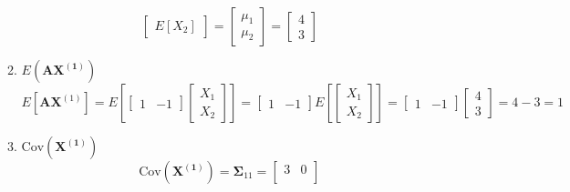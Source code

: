 \begin{enumerate}[font=\bfseries]
\begin{enumerate}
\[\begin{bmatrix}
                    E[X_2]
                \end{bmatrix}
                =
                \begin{bmatrix}
                    \mu_1 \\
                    \mu_2
                \end{bmatrix}
                =\begin{bmatrix}
                    4 \\
                    3
                \end{bmatrix}
            \]
            \item $E\left(\mathbf{A}\mathbf{X^{(1)}}\right)$
            \[
                E\left[\mathbf{A}\mathbf{X}^{(1)}\right]
                =
                E\left[
                    \begin{bmatrix}
                        1 & -1
                    \end{bmatrix}
                    \begin{bmatrix}
                        X_1 \\
                        X_2
                    \end{bmatrix}
                \right]
                =
                \begin{bmatrix}
                    1 & -1
                \end{bmatrix}
                E\left[
                    \begin{bmatrix}
                        X_1 \\
                        X_2
                    \end{bmatrix}
                \right]
                =
                \begin{bmatrix}
                    1 & -1
                \end{bmatrix}
                \begin{bmatrix}
                    4 \\
                    3
                \end{bmatrix}
                =
                4 - 3 = 1
            \]
            \item $\text{Cov}\left(\mathbf{X^{(1)}}\right)$
            \[
                \text{Cov}\left(\mathbf{X^{(1)}}\right)
                =
                \mathbf{\Sigma}_{11}
                =
                \begin{bmatrix}
                    3 & 0 \\

\end{bmatrix}\]
\end{enumerate}
\end{enumerate}
